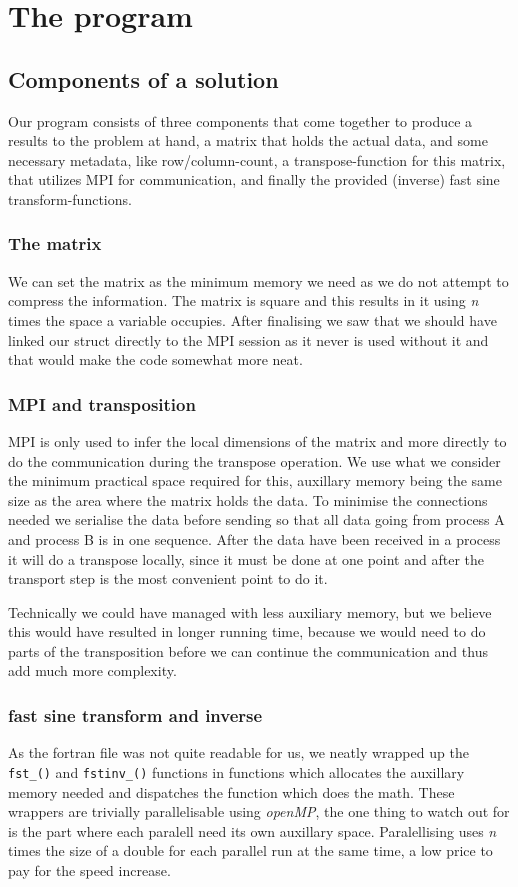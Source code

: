 \section{The program}
\subsection{Components of a solution}
Our program consists of three components that come together to produce a
results to the problem at hand, a matrix that holds the actual data, and some
necessary metadata, like row/column-count, a transpose-function for this
matrix, that utilizes MPI for communication, and finally the provided (inverse)
fast sine transform-functions.

\subsubsection{The matrix}
We can set the matrix as the minimum memory we need as we do not attempt to
compress the information. The matrix is square and this results in it using
\emph{n} times the space a variable occupies. After finalising we saw that we
should have linked our struct directly to the MPI session as it never is used
without it and that would make the code somewhat more neat. 

\subsubsection{MPI and transposition}
MPI is only used to infer the local dimensions of the matrix and more directly
to do the communication during the transpose operation. We use what we consider
the minimum practical space required for this, auxillary memory being the same
size as the area where the matrix holds the data. To minimise the connections
needed we serialise the data before sending so that all data going from process
A and process B is in one sequence. After the data have been received in a
process it will do a transpose locally, since it must be done at one point and
after the transport step is the most convenient point to do it. 

Technically we could have managed with less auxiliary memory, but we believe
this would have resulted in longer running time, because we would need to do
parts of the transposition before we can continue the communication and thus
add much more complexity. 

\subsubsection{fast sine transform and inverse }
As the fortran file was not quite readable for us, we neatly wrapped up the
\texttt{fst\_()} and \texttt{fstinv\_()} functions in functions which allocates the
auxillary memory needed and dispatches the function which does the math. These
wrappers are trivially parallelisable using \emph{openMP}, the one thing to
watch out for is the part where each paralell need its own auxillary space.
Paralellising uses \emph{n} times the size of a double for each parallel run at
the same time, a low price to pay for the speed increase. 

